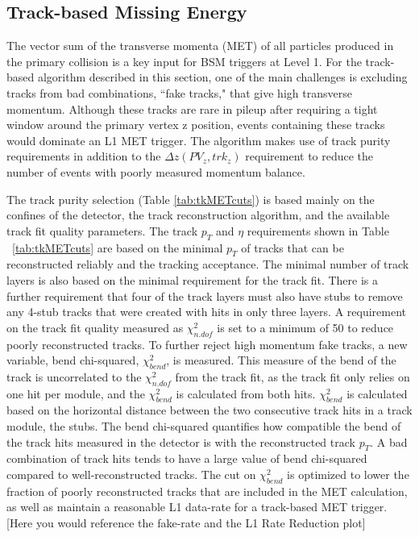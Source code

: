 \subsection{Track-based Missing Energy}
\label{sec:TkMET}

The vector sum of the transverse momenta (MET) of all particles produced in the primary collision is a key input for BSM triggers at Level 1. For the track-based algorithm described in this section, one of the main challenges is excluding tracks from bad combinations, ``fake tracks," that give high transverse momentum. Although these tracks are rare in pileup after requiring a tight window around the primary vertex z position, events containing these tracks would dominate an L1 MET trigger. The algorithm makes use of track purity requirements in addition to the $\Delta z\left(PV_{z}, trk_{z}\right)$ requirement to reduce the number of events with poorly measured momentum balance.

The track purity selection (Table \ref{tab:tkMETcuts}) is based mainly on the confines of the detector, the track reconstruction algorithm, and the available track fit quality parameters. The track $p_{T}$ and $\eta$ requirements shown in Table ~\ref{tab:tkMETcuts} are based on the minimal $p_{T}$ of tracks that can be reconstructed reliably and the tracking acceptance. The minimal number of track layers is also based on the minimal requirement for the track fit. There is a further requirement that four of the track layers must also have stubs to remove any 4-stub tracks that were created with hits in only three layers. A requirement on the track fit quality measured as $\chi^{2}_{n.dof}$ is set to a minimum of 50 to reduce poorly reconstructed tracks. To further reject high momentum fake tracks, a new variable, bend chi-squared, $\chi^{2}_{bend}$, is measured. This measure of the bend of the track is uncorrelated to the $\chi^{2}_{n.dof}$ from the track fit, as the track fit only relies on one hit per module, and the $\chi^{2}_{bend}$ is calculated from both hits. $\chi^{2}_{bend}$ is calculated based on the horizontal distance between the two consecutive track hits in a track module, the stubs. The bend chi-squared quantifies how compatible the bend of the track hits measured in the detector is with the reconstructed track $p_{T}$. A bad combination of track hits tends to have a large value of bend chi-squared compared to well-reconstructed tracks. The cut on $\chi^{2}_{bend}$ is optimized to lower the fraction of poorly reconstructed tracks that are included in the MET calculation, as well as maintain a reasonable L1 data-rate for a track-based MET trigger. [Here you would reference the fake-rate and the L1 Rate Reduction plot]

